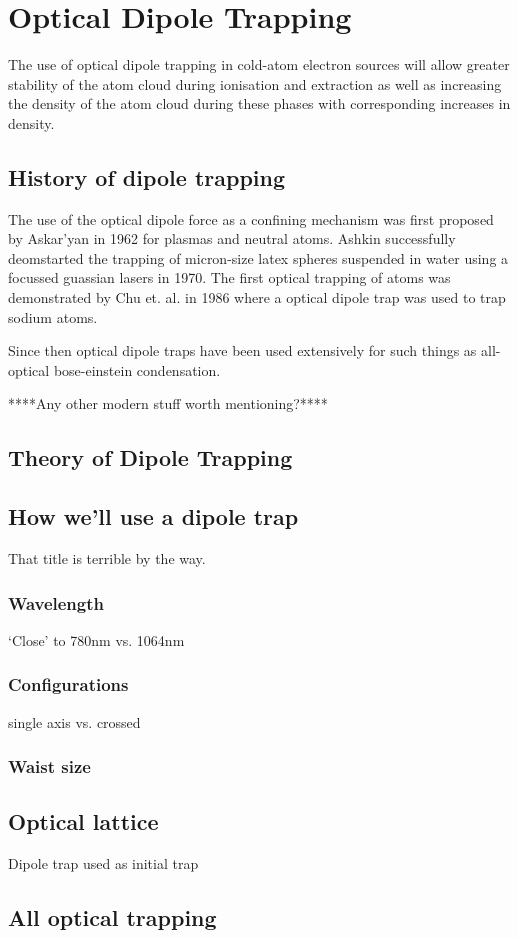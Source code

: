 \section{Optical Dipole Trapping}

The use of optical dipole trapping in cold-atom electron sources will allow greater stability of the atom cloud during ionisation and extraction as well as increasing the density of the atom cloud during these phases with corresponding increases in density.

\subsection{History of dipole trapping}
The use of the optical dipole force as a confining mechanism was first proposed by Askar'yan in 1962\cite{askar'yan_effects_1962} for plasmas and neutral atoms. Ashkin successfully deomstarted the trapping of micron-size latex spheres suspended in water using a focussed guassian lasers in 1970\cite{ashkin_acceleration_1970}. The first optical trapping of atoms was demonstrated by Chu et. al. in 1986\cite{chu_experimental_1986} where a optical dipole trap was used to trap sodium atoms.

Since then optical dipole traps have been used extensively for such things as all-optical bose-einstein condensation\cite{barrett_all-optical_2001}.

****Any other modern stuff worth mentioning?****

\subsection{Theory of Dipole Trapping}

\subsection{How we'll use a dipole trap}
That title is terrible by the way.

\subsubsection{Wavelength}
`Close' to 780nm vs. 1064nm

\subsubsection{Configurations}
single axis vs. crossed

\subsubsection{Waist size}

\subsection{Optical lattice}
Dipole trap used as initial trap

\subsection{All optical trapping}
